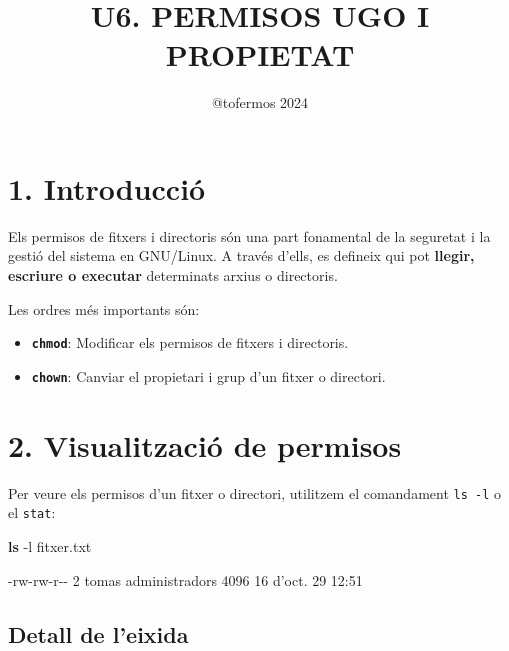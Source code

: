 \documentclass[
  a4paper,
]{article}
\title{U6. PERMISOS UGO I PROPIETAT}
\author{@tofermos 2024}
\date{}
\newenvironment{Shaded}{\begin{snugshade}}{\end{snugshade}}
\newcommand{\AttributeTok}[1]{\textcolor[rgb]{0.13,0.29,0.53}{#1}}
\newcommand{\ExtensionTok}[1]{#1}
\newcommand{\FunctionTok}[1]{\textcolor[rgb]{0.13,0.29,0.53}{\textbf{#1}}}
\newcommand{\NormalTok}[1]{#1}
\providecommand{\tightlist}{%
  \setlength{\itemsep}{0pt}\setlength{\parskip}{0pt}}
\begin{document}
\maketitle

{
\setcounter{tocdepth}{2}
\tableofcontents
}
\newpage
\renewcommand\tablename{Tabla}

\section{1. Introducció}\label{introducciuxf3}

Els permisos de fitxers i directoris són una part fonamental de la
seguretat i la gestió del sistema en GNU/Linux. A través d'ells, es
defineix qui pot \textbf{llegir, escriure o executar} determinats arxius
o directoris.

Les ordres més importants són:

\begin{itemize}
\tightlist
\item
  \textbf{\texttt{chmod}}: Modificar els permisos de fitxers i
  directoris.
\item
  \textbf{\texttt{chown}}: Canviar el propietari i grup d'un fitxer o
  directori.
\end{itemize}

\section{2. Visualització de
permisos}\label{visualitzaciuxf3-de-permisos}

Per veure els permisos d'un fitxer o directori, utilitzem el comandament
\texttt{ls\ -l} o el \texttt{stat}:

\begin{Shaded}
\begin{Highlighting}[]
\FunctionTok{ls} \AttributeTok{{-}l}\NormalTok{ fitxer.txt}
\end{Highlighting}
\end{Shaded}

\begin{Shaded}
\begin{Highlighting}[]
\ExtensionTok{{-}rw{-}rw{-}r{-}{-}}\NormalTok{  2  tomas administradors   4096       16 d’oct.   29 12:51}
\end{Highlighting}
\end{Shaded}

\subsection{Detall de l'eixida}\label{detall-de-leixida}
\end{document}
